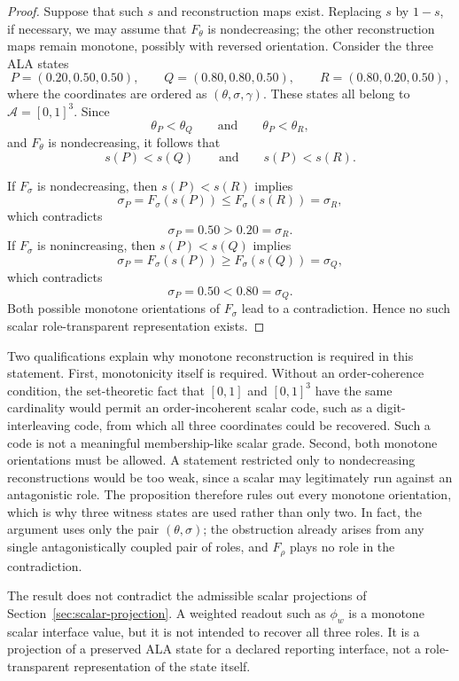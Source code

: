 \documentclass[reqno,final]{amsart}
\theoremstyle{definition}
\theoremstyle{plain}
\theoremstyle{remark}
\providecommand{\cA}{\mathcal{A}}
\begin{document}
\begin{proof}
Suppose that such \(s\) and reconstruction maps exist. Replacing \(s\) by
\(1-s\), if necessary, we may assume that \(F_\theta\) is nondecreasing; the
other reconstruction maps remain monotone, possibly with reversed
orientation. Consider the three ALA states
\[
P=(0.20,0.50,0.50),\qquad
Q=(0.80,0.80,0.50),\qquad
R=(0.80,0.20,0.50),
\]
where the coordinates are ordered as \((\theta,\sigma,\gamma)\). These
states all belong to \(\cA=[0,1]^3\). Since
\[
\theta_P<\theta_Q
\qquad\text{and}\qquad
\theta_P<\theta_R,
\]
and \(F_\theta\) is nondecreasing, it follows that
\[
s(P)<s(Q)
\qquad\text{and}\qquad
s(P)<s(R).
\]

If \(F_\sigma\) is nondecreasing, then \(s(P)<s(R)\) implies
\[
\sigma_P=F_\sigma(s(P))\le F_\sigma(s(R))=\sigma_R,
\]
which contradicts
\[
\sigma_P=0.50>0.20=\sigma_R.
\]
If \(F_\sigma\) is nonincreasing, then \(s(P)<s(Q)\) implies
\[
\sigma_P=F_\sigma(s(P))\ge F_\sigma(s(Q))=\sigma_Q,
\]
which contradicts
\[
\sigma_P=0.50<0.80=\sigma_Q.
\]
Both possible monotone orientations of \(F_\sigma\) lead to a contradiction.
Hence no such scalar role-transparent representation exists.
\end{proof}

Two qualifications explain why monotone reconstruction is required in this statement. First, monotonicity itself is required.
Without an order-coherence condition, the set-theoretic fact that
\([0,1]\) and \([0,1]^3\) have the same cardinality would permit an
order-incoherent scalar code, such as a digit-interleaving code, from which
all three coordinates could be recovered. Such a code is not a meaningful
membership-like scalar grade. Second, both monotone orientations must be
allowed. A statement restricted only to nondecreasing reconstructions would
be too weak, since a scalar may legitimately run against an antagonistic
role. The proposition therefore rules out every monotone orientation, which
is why three witness states are used rather than only two. In fact, the
argument uses only the pair \((\theta,\sigma)\); the obstruction already
arises from any single antagonistically coupled pair of roles, and
\(F_\rho\) plays no role in the contradiction.

The result does not contradict the admissible scalar projections of
Section~\ref{sec:scalar-projection}. A weighted readout such as \(\phi_w\)
is a monotone scalar interface value, but it is not intended to recover all
three roles. It is a projection of a preserved ALA state for a declared
reporting interface, not a role-transparent representation of the state
itself.
\end{document}
